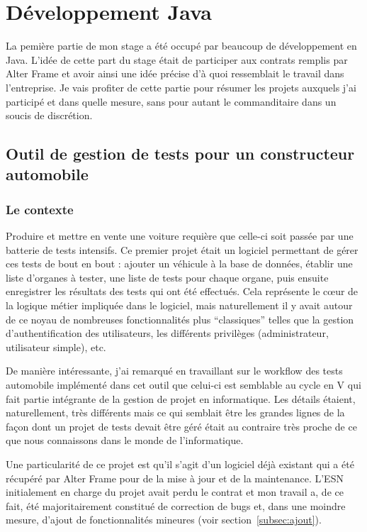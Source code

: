 \section{Développement Java}
La pemière partie de mon stage a été occupé par beaucoup de développement en Java. L'idée de cette part du stage était de participer aux contrats remplis par Alter Frame et avoir ainsi une idée précise d'à quoi ressemblait le travail dans l'entreprise. Je vais profiter de cette partie pour résumer les projets auxquels j'ai participé et dans quelle mesure, sans pour autant le commanditaire dans un soucis de discrétion.

\subsection{Outil de gestion de tests pour un constructeur automobile}
\subsubsection{Le contexte}
Produire et mettre en vente une voiture requière que celle-ci soit passée par une batterie de tests intensifs. Ce premier projet était un logiciel permettant de gérer ces tests de bout en bout : ajouter un véhicule à la base de données, établir une liste d'organes à tester, une liste de tests pour chaque organe, puis ensuite enregistrer les résultats des tests qui ont été effectués. Cela représente le c\oe{}ur de la logique métier impliquée dans le logiciel, mais naturellement il y avait autour de ce noyau de nombreuses fonctionnalités plus ``classiques'' telles que la gestion d'authentification des utilisateurs, les différents privilèges (administrateur, utilisateur simple), etc.

De manière intéressante, j'ai remarqué en travaillant sur le workflow des tests automobile implémenté dans cet outil que celui-ci est semblable au cycle en V qui fait partie intégrante de la gestion de projet en informatique. Les détails étaient, naturellement, très différents mais ce qui semblait être les grandes lignes de la façon dont un projet de tests devait être géré était au contraire très proche de ce que nous connaissons dans le monde de l'informatique.

Une particularité de ce projet est qu'il s'agit d'un logiciel déjà existant qui a été récupéré par Alter Frame pour de la mise à jour et de la maintenance. L'ESN initialement en charge du projet avait perdu le contrat et mon travail a, de ce fait, été majoritairement constitué de correction de bugs et, dans une moindre mesure, d'ajout de fonctionnalités mineures (voir section~\ref{subsec:ajout}).

